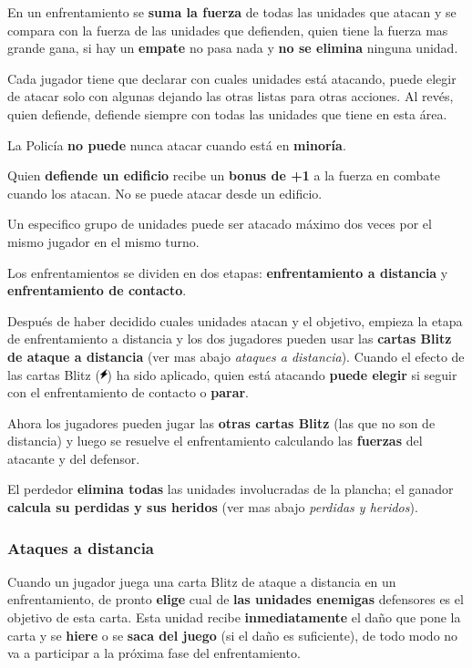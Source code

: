 \documentclass[a4paper,13pt]{scrartcl}
\begin{document}
En un enfrentamiento se \textbf{suma la fuerza} de todas las unidades que atacan y se compara con la fuerza de las unidades que
defienden, quien tiene la fuerza mas grande gana, si hay un \textbf{empate} no pasa nada y \textbf{no se elimina} ninguna unidad.

Cada jugador tiene que declarar con cuales unidades est\'a atacando, puede elegir de atacar solo con algunas dejando las
otras listas para otras acciones. Al rev\'es, quien defiende, defiende siempre con todas las unidades que tiene en esta
\'area.

La Polic\'ia \textbf{no puede} nunca atacar cuando est\'a en \textbf{minor\'ia}.

Quien \textbf{defiende un edificio} recibe un \textbf{bonus de +1} a la fuerza en combate cuando los atacan. No se puede atacar desde un
edificio.

Un especifico grupo de unidades puede ser atacado m\'aximo dos veces por el mismo jugador en el mismo turno.

Los enfrentamientos se dividen en dos etapas: \textbf{enfrentamiento a distancia} y \textbf{enfrentamiento de contacto}.

Despu\'es de haber decidido cuales unidades atacan y el objetivo, empieza la etapa de enfrentamiento a distancia y los
dos jugadores pueden usar las \textbf{cartas Blitz de ataque a distancia} (ver mas abajo {\itshape ataques a distancia}). Cuando el
efecto de las cartas Blitz (\includegraphics[height=9pt]{blitz.png}) ha sido aplicado, quien est\'a atacando \textbf{puede elegir} si seguir con el enfrentamiento de
contacto o \textbf{parar}.

Ahora los jugadores pueden jugar las \textbf{otras cartas Blitz} (las que no son de distancia) y luego se resuelve el
enfrentamiento calculando las \textbf{fuerzas} del atacante y del defensor.

El perdedor \textbf{elimina todas} las unidades involucradas de la plancha; el ganador \textbf{calcula su perdidas y sus heridos} (ver mas
abajo {\itshape perdidas y heridos}).

\subsubsection*{Ataques a distancia}
Cuando un jugador juega una carta Blitz de ataque a distancia en un enfrentamiento, de pronto \textbf{elige} cual de \textbf{las unidades
enemigas} defensores es el objetivo de esta carta. Esta unidad recibe \textbf{inmediatamente} el da\~no que pone la carta y se
\textbf{hiere} o se \textbf{saca del juego} (si el da\~no es suficiente), de todo modo no va a participar a la pr\'oxima fase del
enfrentamiento.
\end{document}
